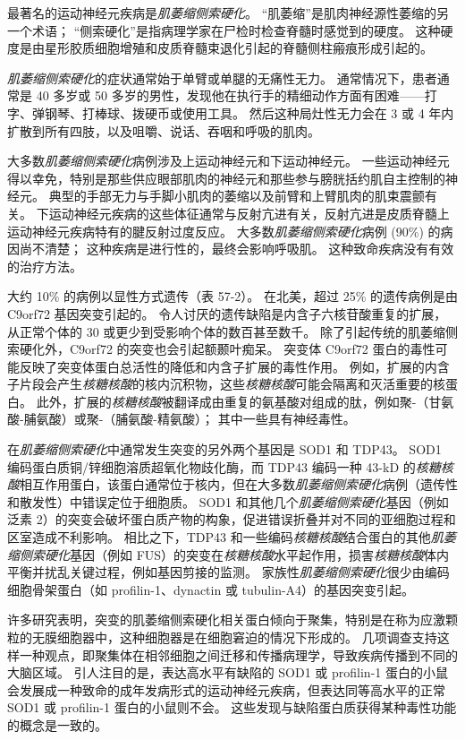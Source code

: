 最著名的运动神经元疾病是\textit{肌萎缩侧索硬化}。
“肌萎缩”是肌肉神经源性萎缩的另一个术语；
“侧索硬化”是指病理学家在尸检时检查脊髓时感觉到的硬度。
这种硬度是由星形胶质细胞增殖和皮质脊髓束退化引起的脊髓侧柱瘢痕形成引起的。


\textit{肌萎缩侧索硬化}的症状通常始于单臂或单腿的无痛性无力。
通常情况下，患者通常是 40 多岁或 50 多岁的男性，发现他在执行手的精细动作方面有困难——打字、弹钢琴、打棒球、拨硬币或使用工具。
然后这种局灶性无力会在 3 或 4 年内扩散到所有四肢，以及咀嚼、说话、吞咽和呼吸的肌肉。


大多数\textit{肌萎缩侧索硬化}病例涉及上运动神经元和下运动神经元。
一些运动神经元得以幸免，特别是那些供应眼部肌肉的神经元和那些参与膀胱括约肌自主控制的神经元。
典型的手部无力与手脚小肌肉的萎缩以及前臂和上臂肌肉的肌束震颤有关。
下运动神经元疾病的这些体征通常与反射亢进有关，反射亢进是皮质脊髓上运动神经元疾病特有的腱反射过度反应。
大多数\textit{肌萎缩侧索硬化}病例 (90\%) 的病因尚不清楚；
这种疾病是进行性的，最终会影响呼吸肌。
这种致命疾病没有有效的治疗方法。


大约 10\% 的病例以显性方式遗传（表 57-2）。
在北美，超过 25\% 的遗传病例是由 C9orf72 基因突变引起的。
令人讨厌的遗传缺陷是内含子六核苷酸重复的扩展，从正常个体的 30 或更少到受影响个体的数百甚至数千。
除了引起传统的肌萎缩侧索硬化外，C9orf72 的突变也会引起额颞叶痴呆。
突变体 C9orf72 蛋白的毒性可能反映了突变体蛋白总活性的降低和内含子扩展的毒性作用。
例如，扩展的内含子片段会产生\textit{核糖核酸}的核内沉积物，这些\textit{核糖核酸}可能会隔离和灭活重要的核蛋白。
此外，扩展的\textit{核糖核酸}被翻译成由重复的氨基酸对组成的肽，例如聚-（甘氨酸-脯氨酸）或聚-（脯氨酸-精氨酸）；
其中一些具有神经毒性。


在\textit{肌萎缩侧索硬化}中通常发生突变的另外两个基因是 SOD1 和 TDP43。
SOD1 编码蛋白质铜/锌细胞溶质超氧化物歧化酶，而 TDP43 编码一种 43-kD 的\textit{核糖核酸}相互作用蛋白，该蛋白通常位于核内，但在大多数\textit{肌萎缩侧索硬化}病例（遗传性和散发性）中错误定位于细胞质。
SOD1 和其他几个\textit{肌萎缩侧索硬化}基因（例如泛素 2）的突变会破坏蛋白质产物的构象，促进错误折叠并对不同的亚细胞过程和区室造成不利影响。
相比之下，TDP43 和一些编码\textit{核糖核酸}结合蛋白的其他\textit{肌萎缩侧索硬化}基因（例如 FUS）的突变在\textit{核糖核酸}水平起作用，损害\textit{核糖核酸}体内平衡并扰乱关键过程，例如基因剪接的监测。
家族性\textit{肌萎缩侧索硬化}很少由编码细胞骨架蛋白（如 profilin-1、dynactin 或 tubulin-A4）的基因突变引起。


许多研究表明，突变的肌萎缩侧索硬化相关蛋白倾向于聚集，特别是在称为应激颗粒的无膜细胞器中，这种细胞器是在细胞窘迫的情况下形成的。
几项调查支持这样一种观点，即聚集体在相邻细胞之间迁移和传播病理学，导致疾病传播到不同的大脑区域。
引人注目的是，表达高水平有缺陷的 SOD1 或 profilin-1 蛋白的小鼠会发展成一种致命的成年发病形式的运动神经元疾病，但表达同等高水平的正常 SOD1 或 profilin-1 蛋白的小鼠则不会。
这些发现与缺陷蛋白质获得某种毒性功能的概念是一致的。


